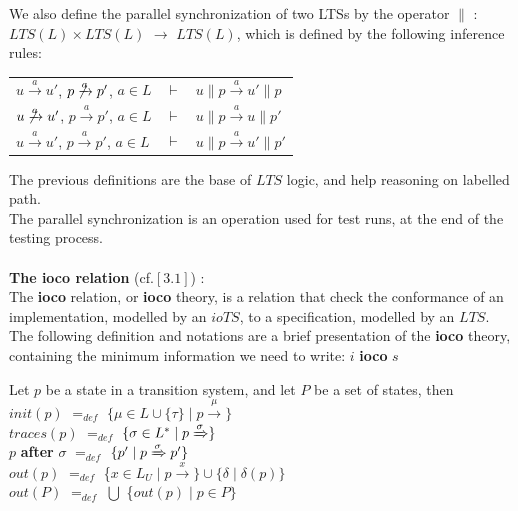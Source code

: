 \documentclass[a4paper]{report}
\begin{document}
\begin{definition}
We also define the parallel synchronization of two LTSs by the operator $ \| $ : $LTS(L) \times LTS(L)$ $\rightarrow $ $ LTS(L) $, which is defined by the following inference rules:\\

\begin{tabular}{lll}
   $u \xrightarrow{a} u'$, $ p \not \xrightarrow{a} p'$, $a\in L$ & $\vdash$ & $u \| p \xrightarrow{a} u' \| p$ \\
   $u \not \xrightarrow{a} u'$, $p \xrightarrow{a} p'$, $a\in L$ & $\vdash$ & $u \| p \xrightarrow{a} u \| p'$ \\
   $u \xrightarrow{a} u'$, $p \xrightarrow{a} p'$, $a\in L$ & $\vdash$ & $u \| p \xrightarrow{a} u' \| p'$ \\
\end{tabular}
\end{definition}
The previous definitions are the base of $LTS$ logic, and help reasoning on labelled path.\\
The parallel synchronization is an operation used for test runs, at the end of the testing process.\\
$ $\\
\newline
\textbf{The ioco relation} (cf.$[3.1]$) :\\
\newline
The \textbf{ioco} relation, or \textbf{ioco} theory, is a relation that check the conformance of an implementation, modelled by an $ioTS$, to a specification, modelled by an $LTS$. The following definition and notations are a brief presentation of the \textbf{ioco} theory, containing the minimum information we need to write: $i$ \textbf{ioco} $s$\\

\begin{definition}
Let $p$ be a state in a transition system, and let $P$ be a set of states, then\\
\newline
$init(p)$ $=_{def}$ $\{ \mu \in L \cup \{ \tau \} \mid p \xrightarrow{\mu} \}$\\
\newline
$traces(p)$ $=_{def}$ $\{ \sigma \in L^* \mid p \xRightarrow{\sigma} \}$\\
\newline
$p$ \textbf{after} $\sigma$ $=_{def}$ $\{ p' \mid p \xRightarrow{\sigma} p' \}$\\
\newline
$out(p)$ $=_{def}$ \{$x\in L_U \mid p \xrightarrow{x} \} \cup \{ \delta \mid \delta (p) \}$\\
\newline
$out(P)$ $=_{def}$ $ \bigcup$ \{$out(p) \mid p \in P \}$\\
\end{definition}
\end{document}
